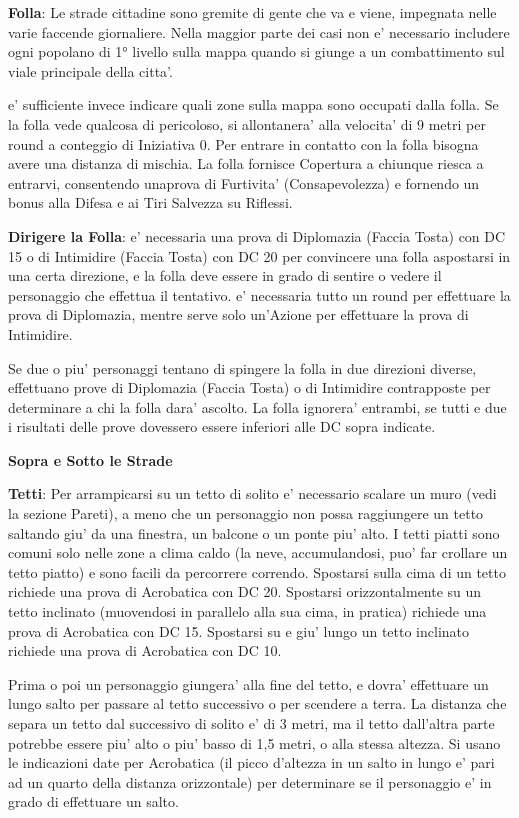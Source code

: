 \documentclass[a4paper,11pt,twoside,openany]{dndbook}
\begin{document}
{\textbf{Folla}: Le strade cittadine sono gremite di gente che va e viene, impegnata nelle varie faccende giornaliere. Nella maggior parte dei casi non e' necessario includere ogni popolano di 1° livello sulla mappa quando si giunge a un combattimento sul viale principale della citta'.

e' sufficiente invece indicare quali zone sulla mappa sono occupati dalla folla. Se la folla vede qualcosa di pericoloso, si allontanera' alla velocita' di 9 metri per round a conteggio di Iniziativa 0. Per entrare in contatto con la folla bisogna avere una distanza di mischia. La folla fornisce Copertura a chiunque riesca a entrarvi, consentendo unaprova di Furtivita' (Consapevolezza) e fornendo un bonus alla Difesa e ai Tiri Salvezza su Riflessi.

\textbf{Dirigere la Folla}: e' necessaria una prova di Diplomazia (Faccia Tosta) con DC 15 o di Intimidire (Faccia Tosta) con DC 20 per convincere una folla aspostarsi in una certa direzione, e la folla deve essere in grado di sentire o vedere il personaggio che effettua il tentativo. e' necessaria tutto un round per effettuare la prova di Diplomazia, mentre serve solo un'Azione per effettuare la prova di Intimidire.

Se due o piu' personaggi tentano di spingere la folla in due direzioni diverse, effettuano prove di Diplomazia (Faccia Tosta) o di Intimidire contrapposte per determinare a chi la folla dara' ascolto. La folla ignorera' entrambi, se tutti e due i risultati delle prove dovessero essere inferiori alle DC sopra indicate.

\textbf{Sopra e Sotto le Strade}

\textbf{Tetti}: Per arrampicarsi su un tetto di solito e' necessario scalare un muro (vedi la sezione Pareti), a meno che un personaggio non possa raggiungere un tetto saltando giu' da una finestra, un balcone o un ponte piu' alto. I tetti piatti sono comuni solo nelle zone a clima caldo (la neve, accumulandosi, puo' far crollare un tetto piatto) e sono facili da percorrere correndo. Spostarsi sulla cima di un tetto richiede una prova di Acrobatica con DC 20. Spostarsi orizzontalmente su un tetto inclinato (muovendosi in parallelo alla sua cima, in pratica) richiede una prova di Acrobatica con DC 15. Spostarsi su e giu' lungo un tetto inclinato richiede una prova di Acrobatica con DC 10.

Prima o poi un personaggio giungera' alla fine del tetto, e dovra' effettuare un lungo salto per passare al tetto successivo o per scendere a terra. La distanza che separa un tetto dal successivo di solito e' di 3 metri, ma il tetto dall'altra parte potrebbe essere piu' alto o piu' basso di 1,5 metri, o alla stessa altezza. Si usano le indicazioni date per Acrobatica (il picco d'altezza in un salto in lungo e' pari ad un quarto della distanza orizzontale) per determinare se il personaggio e' in grado di effettuare un salto.

}
\end{document}
